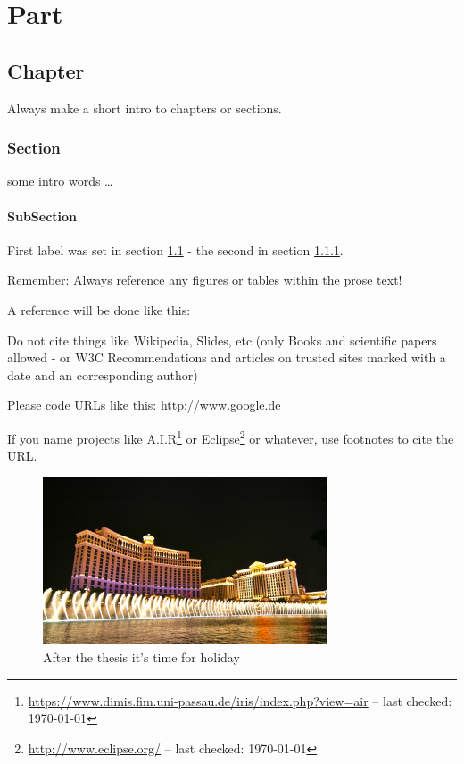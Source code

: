 \part{Part}

\chapter{Chapter}

Always make a short intro to chapters or sections.

\section{Section}
\label{erstesLabel}

some intro words \dots

\subsection{SubSection}
\label{zweitesLabel}

First label was set in section \ref{erstesLabel} - the second in section \ref{zweitesLabel}.

Remember: Always reference any figures or tables within the prose text!

A reference will be done like this: \cite{keyToBibEntry}

Do not cite things like Wikipedia, Slides, etc (only Books and scientific papers allowed - or W3C Recommendations \cite{w3c_example} and articles on trusted sites marked with a date and an corresponding author)

Please code URLs like this: \url{http://www.google.de}

If you name projects like A.I.R\footnote{\url{https://www.dimis.fim.uni-passau.de/iris/index.php?view=air} -- last checked: \today} or Eclipse\footnote{\url{http://www.eclipse.org/} -- last checked: \today} or whatever, use footnotes to cite the URL.

\begin{figure}[H]
	\begin{center}
		\includegraphics[width=0.75\textwidth]{holiday.png}
	\end{center}
	\caption{After the thesis it's time for holiday}
	\label{labelToRef}
\end{figure}

